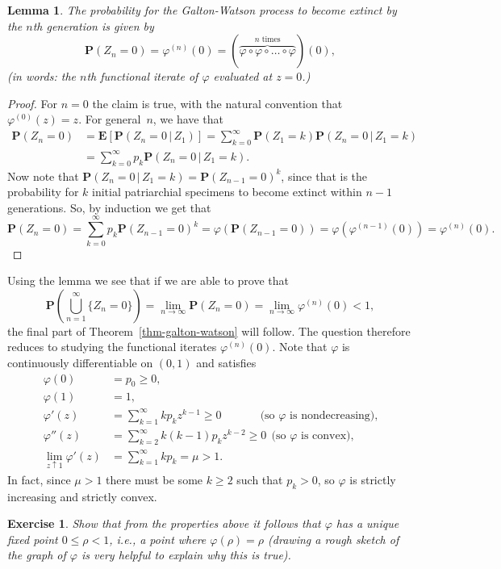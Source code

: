 \documentclass[12pt]{article}
\newtheorem{lem}[thm]{Lemma}
\newtheorem{exercise}[thm]{Exercise}
\newcommand{\prob}{\mathbf{P}}
\newcommand{\expec}{\mathbf{E}}
\theoremstyle{example}
\begin{document}
\begin{lem}
The probability for the Galton-Watson process to become extinct by the $n$th generation is given by
$$ \prob(Z_n = 0) = \varphi^{(n)}(0) = (\overbrace{\varphi\circ \varphi\circ \ldots \circ \varphi}^{\textrm{$n$ times}})(0), $$
(in words: the $n$th functional iterate of $\varphi$ evaluated at $z=0$.)
\end{lem}

\begin{proof} For $n=0$ the claim is true, with the natural convention that $\varphi^{(0)}(z)=z$. For general~$n$, we have that
\begin{align*}
\prob(Z_n = 0) &= \expec\left[ \prob\left( Z_n=0\,|\,Z_1 \right) \right] = \sum_{k=0}^\infty \prob(Z_1=k) \prob\left(Z_n=0\,|\,Z_1=k\right)
\\ &= \sum_{k=0}^\infty p_k \prob\left(Z_n=0\,|\,Z_1=k\right).
\end{align*}
Now note that $\prob\left(Z_n=0\,|\,Z_1=k\right)=\prob(Z_{n-1}=0)^k$, since that is the probability for $k$ initial patriarchial specimens to become extinct within $n-1$ generations. So, by induction we get that
$$  \prob(Z_n=0) = \sum_{k=0}^\infty p_k \prob(Z_{n-1}=0)^k = \varphi(\prob(Z_{n-1}=0)) = \varphi(\varphi^{(n-1)}(0))
= \varphi^{(n)}(0).
$$
\end{proof}

Using the lemma we see that if we are able to prove that 
$$\prob\left(\bigcup_{n=1}^\infty \{Z_n=0\}\right)= \lim_{n\to\infty} \prob(Z_n=0) = \lim_{n\to\infty} \varphi^{(n)}(0)<1,$$ 
the final part of Theorem~\ref{thm-galton-watson} will follow. The question therefore reduces to studying the functional iterates $\varphi^{(n)}(0)$. Note that $\varphi$ is continuously differentiable on $(0,1)$ and satisfies
\begin{align*} 
\varphi(0) &= p_0 \ge 0, \\
\varphi(1) &=1, \\
\varphi'(z) &= \sum_{k=1}^\infty k p_k z^{k-1} \ge 0 \qquad\quad\  \ \textrm{(so $\varphi$ is nondecreasing),}\\
\varphi''(z) &= \sum_{k=2}^\infty k(k-1) p_k z^{k-2} \ge 0 \ \ \textrm{(so $\varphi$ is convex)}, \\
\lim_{z\uparrow 1} \varphi'(z) &= \sum_{k=1}^\infty k p_k = \mu > 1. 
\end{align*}
In fact, since $\mu>1$ there must be some $k\ge 2$ such that $p_k>0$, so $\varphi$ is strictly increasing and strictly convex. 

\begin{exercise} Show that from the properties above it follows that $\varphi$ has a unique fixed point $0\le \rho<1$, i.e., a point where $\varphi(\rho)=\rho$ (drawing a rough sketch of the graph of $\varphi$ is very helpful to explain why this is true).
\end{exercise}
\end{document}

